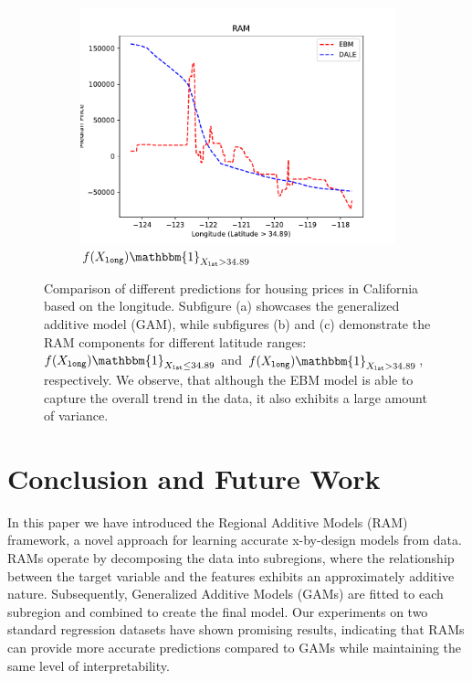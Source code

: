 \documentclass[runningheads]{llncs}
\newcommand{\when}[1]{\mathbbm{1}_{#1}}
\begin{document}
\begin{figure}[htbp]
\begin{subfigure}{0.32\textwidth}
        \centering
        \includegraphics[width=\textwidth]{figures/california_ram_2}
        \caption{\(f(X_{\mathtt{long}}) \when{X_{\mathtt{lat}} > 34.89}\)}
        \label{subfig:california_ram_2}
    \end{subfigure}
    \caption{Comparison of different predictions for housing prices in California based on the longitude.
    Subfigure (a) showcases the generalized additive model (GAM),
        while subfigures (b) and (c) demonstrate the RAM components for different latitude ranges:
        \(f(X_{\mathtt{long}}) \when{X_{\mathtt{lat}} \leq 34.89}\) and
        \(f(X_{\mathtt{long}}) \when{X_{\mathtt{lat}} > 34.89}\), respectively.
        We observe, that although the EBM model is able to capture the overall trend in the data,
        it also exhibits a large amount of variance.}
    \label{fig:california_housing}
\end{figure}

\section{Conclusion and Future Work}

In this paper we have introduced the Regional Additive Models (RAM) framework, a novel approach for learning accurate
x-by-design models from data.
RAMs operate by decomposing the data into subregions, where the relationship between the target variable and the
features exhibits an approximately additive nature.
Subsequently, Generalized Additive Models (GAMs) are fitted to each subregion and combined to create the final model.
Our experiments on two standard regression datasets have shown promising results, indicating that RAMs can provide more accurate predictions compared to GAMs while maintaining the same level of interpretability.
\end{document}
